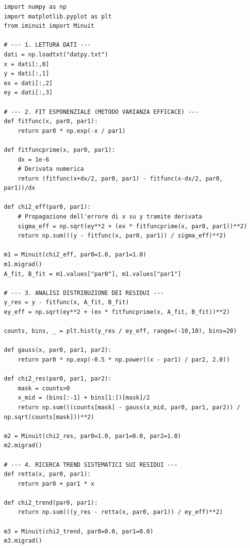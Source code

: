 \documentclass[openany,a4paper,12pt]{book}
\begin{document}
\begin{lstlisting}[caption={Fit esponenziale con varianza efficace e studio dei residui}]
import numpy as np
import matplotlib.pyplot as plt
from iminuit import Minuit

# --- 1. LETTURA DATI ---
dati = np.loadtxt("datpy.txt")
x = dati[:,0]
y = dati[:,1]
ex = dati[:,2]
ey = dati[:,3]

# --- 2. FIT ESPONENZIALE (METODO VARIANZA EFFICACE) ---
def fitfunc(x, par0, par1):
    return par0 * np.exp(-x / par1)

def fitfuncprime(x, par0, par1):
    dx = 1e-6
    # Derivata numerica
    return (fitfunc(x+dx/2, par0, par1) - fitfunc(x-dx/2, par0, par1))/dx

def chi2_eff(par0, par1):
    # Propagazione dell'errore di x su y tramite derivata
    sigma_eff = np.sqrt(ey**2 + (ex * fitfuncprime(x, par0, par1))**2)
    return np.sum(((y - fitfunc(x, par0, par1)) / sigma_eff)**2)

m1 = Minuit(chi2_eff, par0=1.0, par1=1.0)
m1.migrad()
A_fit, B_fit = m1.values["par0"], m1.values["par1"]

# --- 3. ANALISI DISTRIBUZIONE DEI RESIDUI ---
y_res = y - fitfunc(x, A_fit, B_fit)
ey_eff = np.sqrt(ey**2 + (ex * fitfuncprime(x, A_fit, B_fit))**2)

counts, bins, _ = plt.hist(y_res / ey_eff, range=(-10,10), bins=20)

def gauss(x, par0, par1, par2):
    return par0 * np.exp(-0.5 * np.power((x - par1) / par2, 2.0))

def chi2_res(par0, par1, par2):
    mask = counts>0
    x_mid = (bins[:-1] + bins[1:])[mask]/2
    return np.sum(((counts[mask] - gauss(x_mid, par0, par1, par2)) / np.sqrt(counts[mask]))**2)

m2 = Minuit(chi2_res, par0=1.0, par1=0.0, par2=1.0)
m2.migrad()

# --- 4. RICERCA TREND SISTEMATICI SUI RESIDUI ---
def retta(x, par0, par1):
    return par0 + par1 * x

def chi2_trend(par0, par1):
    return np.sum(((y_res - retta(x, par0, par1)) / ey_eff)**2)

m3 = Minuit(chi2_trend, par0=0.0, par1=0.0)
m3.migrad()
\end{lstlisting}


\vspace{1cm}
\end{document}
